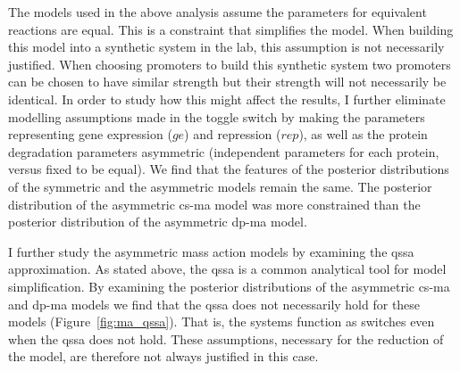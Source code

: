 The models used in the above analysis assume the parameters for equivalent reactions are equal. This is a constraint that simplifies the model. When building this model into a synthetic system in the lab, this assumption is not necessarily justified. When choosing promoters to build this synthetic system two promoters can be chosen to have similar strength but their strength will not necessarily be identical.  In order to study how this might affect the results, I further eliminate modelling assumptions made in the toggle switch by making the parameters representing gene expression ($ge$) and repression ($rep$), as well as the protein degradation parameters asymmetric (independent parameters for each protein, versus fixed to be equal). We find that the features of the posterior distributions of the symmetric and the asymmetric models remain the same. The posterior distribution of the asymmetric \acrshort{cs-ma} model was more constrained than the posterior distribution of the asymmetric \acrshort{dp-ma} model. 

I further study the asymmetric mass action models by examining the \acrshort{qssa} approximation. As stated above, the \acrshort{qssa} is a common analytical tool for model simplification. By examining the posterior distributions of the asymmetric \acrshort{cs-ma} and \acrshort{dp-ma} models we find that the \acrshort{qssa} does not necessarily hold for these models (Figure~\ref{fig:ma_qssa}). That is, the systems function as switches even when the \acrshort{qssa} does not hold. These assumptions, necessary for the reduction of the model, are therefore not always justified in this case. 

